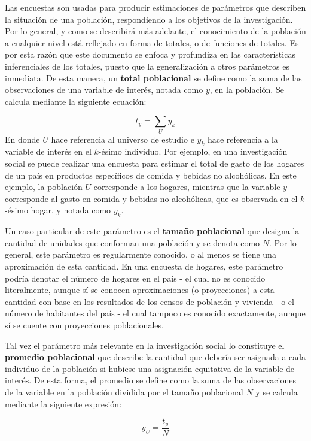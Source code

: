 Las encuestas son usadas para producir estimaciones de parámetros que describen la situación de una población, respondiendo a los objetivos de la investigación. Por lo general, y como se describirá más adelante, el conocimiento de la población a cualquier nivel está reflejado en forma de totales, o de funciones de totales. Es por esta razón que este documento se enfoca y profundiza en las características inferenciales de los totales, puesto que la generalización a otros parámetros es inmediata. De esta manera, un \textbf{total poblacional} se define como la suma de las observaciones de una variable de interés, notada como \(y\), en la población. Se calcula mediante la siguiente ecuación:

\[t_y = \sum_U y_k\]
En donde \(U\) hace referencia al universo de estudio e \(y_k\) hace referencia a la variable de interés en el \(k\)-ésimo individuo. Por ejemplo, en una investigación social se puede realizar una encuesta para estimar el total de gasto de los hogares de un país en productos específicos de comida y bebidas no alcohólicas. En este ejemplo, la población \(U\) corresponde a los hogares, mientras que la variable \(y\) corresponde al gasto en comida y bebidas no alcohólicas, que es observada en el \(k\)-ésimo hogar, y notada como \(y_k\).

Un caso particular de este parámetro es el \textbf{tamaño poblacional} que designa la cantidad de unidades que conforman una población y se denota como \(N\). Por lo general, este parámetro es regularmente conocido, o al menos se tiene una aproximación de esta cantidad. En una encuesta de hogares, este parámetro podría denotar el número de hogares en el país - el cual no es conocido literalmente, aunque sí se conocen aproximaciones (o proyecciones) a esta cantidad con base en los resultados de los censos de población y vivienda - o el número de habitantes del país - el cual tampoco es conocido exactamente, aunque sí se cuente con proyecciones poblacionales.

Tal vez el parámetro más relevante en la investigación social lo constituye el \textbf{promedio poblacional} que describe la cantidad que debería ser asignada a cada individuo de la población si hubiese una asignación equitativa de la variable de interés. De esta forma, el promedio se define como la suma de las observaciones de la variable en la población dividida por el tamaño poblacional \(N\) y se calcula mediante la siguiente expresión:

\[\bar{y}_U = \frac{t_y}{N}\]

